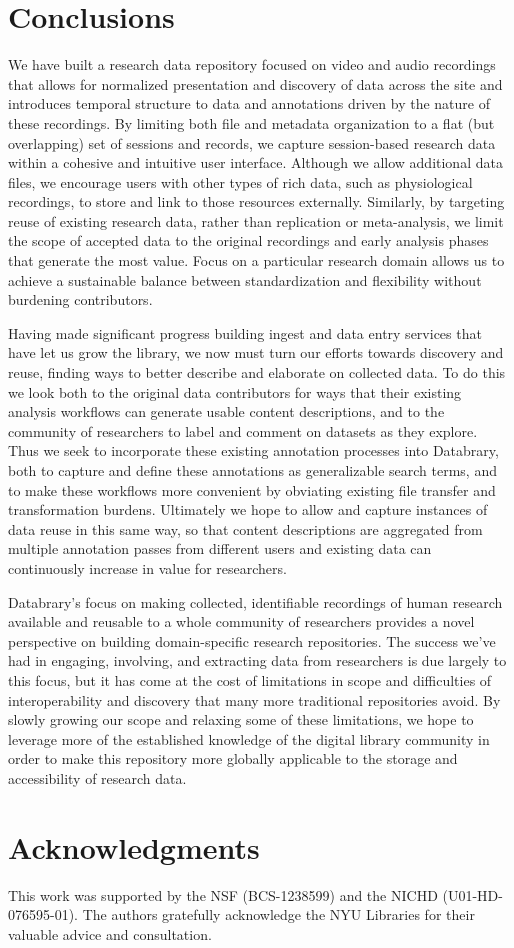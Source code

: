 \documentclass{sig-alternate}
\begin{document}
\section{Conclusions}

We have built a research data repository focused on video and audio recordings that allows for normalized presentation and discovery of data across the site and introduces temporal structure to data and annotations driven by the nature of these recordings.
By limiting both file and metadata organization to a flat (but overlapping) set of sessions and records, we capture session-based research data within a cohesive and intuitive user interface.
Although we allow additional data files, we encourage users with other types of rich data, such as physiological recordings, to store and link to those resources externally.
Similarly, by targeting reuse of existing research data, rather than replication or meta-analysis, we limit the scope of accepted data to the original recordings and early analysis phases that generate the most value.
Focus on a particular research domain allows us to achieve a sustainable balance between standardization and flexibility without burdening contributors.

Having made significant progress building ingest and data entry services that have let us grow the library, we now must turn our efforts towards discovery and reuse, finding ways to better describe and elaborate on collected data.
To do this we look both to the original data contributors for ways that their existing analysis workflows can generate usable content descriptions, and to the community of researchers to label and comment on datasets as they explore.
Thus we seek to incorporate these existing annotation processes into Databrary, both to capture and define these annotations as generalizable search terms, and to make these workflows more convenient by obviating existing file transfer and transformation burdens.
Ultimately we hope to allow and capture instances of data reuse in this same way, so that content descriptions are aggregated from multiple annotation passes from different users and existing data can continuously increase in value for researchers.

Databrary's focus on making collected, identifiable recordings of human research available and reusable to a whole community of researchers provides a novel perspective on building domain-specific research repositories.
The success we've had in engaging, involving, and extracting data from researchers is due largely to this focus, but it has come at the cost of limitations in scope and difficulties of interoperability and discovery that many more traditional repositories avoid.
By slowly growing our scope and relaxing some of these limitations, we hope to leverage more of the established knowledge of the digital library community in order to make this repository more globally applicable to the storage and accessibility of research data.

\section*{Acknowledgments}

This work was supported by the NSF (BCS-1238599) and the NICHD (U01-HD-076595-01).
The authors gratefully acknowledge the NYU Libraries for their valuable advice and consultation.



\end{document}
